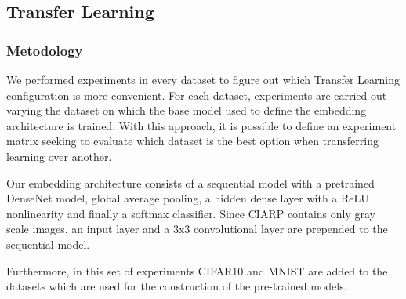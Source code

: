 \doublerulesep 0.1pt
\begin{table*}[!ht]
\begin{footnotesize}
\caption{Accuracy of Wide-DenseNet on RWTH as number of training samples is varied.} \label{tab:results:rwth:densenet}
\end{footnotesize}
\end{table*}

\subsection{Transfer Learning} \label{sec:experiments:tl}

\subsubsection{Metodology}

We performed experiments in every dataset to figure out which Transfer Learning configuration is more convenient. For each dataset, experiments are carried out varying the dataset on which the base model used to define the embedding architecture is trained. With this approach, it is possible to define an experiment matrix seeking to evaluate which dataset is the best option when transferring learning over another.

Our embedding architecture consists of a sequential model with a pretrained DenseNet model, global average pooling, a hidden dense layer with a ReLU nonlinearity and finally a softmax classifier. Since CIARP contains only gray scale images, an input layer and a 3x3 convolutional layer are prepended to the sequential model.

Furthermore, in this set of experiments CIFAR10\cite{cifar10dataset} and MNIST\cite{lecun-mnisthandwrittendigit-2010} are added to the datasets which are used for the construction of the pre-trained models.

